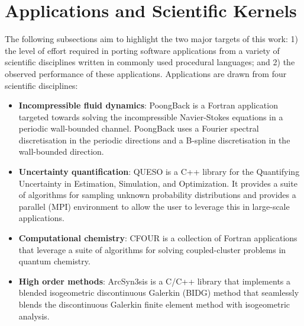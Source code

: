 \section{Applications and Scientific Kernels}
\label{sec:apps}

The following subsections aim to highlight the two major targets of this work: 1) the level of effort
required in porting software applications from a variety of scientific
disciplines written in commonly used procedural languages; and 2) the observed
performance of these applications.  Applications are drawn from four 
scientific disciplines:
\begin{itemize}
\item {\bf Incompressible fluid dynamics}:  PoongBack is a Fortran application
targeted towards solving the incompressible Navier-Stokes equations in a
periodic wall-bounded channel.  PoongBack uses a Fourier spectral
discretisation in the periodic directions and a B-spline discretisation in the
wall-bounded direction.

\item {\bf Uncertainty quantification}:  QUESO is a C++ library for the
Quantifying Uncertainty in Estimation, Simulation, and Optimization.  It
provides a suite of algorithms for sampling unknown probability distributions
and provides a parallel (MPI) environment to allow the user to leverage this in
large-scale applications.  %

\item {\bf Computational chemistry}:  CFOUR is a collection of Fortran
applications that leverage a suite of algorithms for solving coupled-cluster
problems in quantum chemistry.

\item {\bf High order methods}:  ArcSyn3sis is a C/C++ library that implements
a blended isogeometric discontinuous Galerkin (BIDG) method that seamlessly
blends the discontinuous Galerkin finite element method with isogeometric analysis.

\end{itemize}
